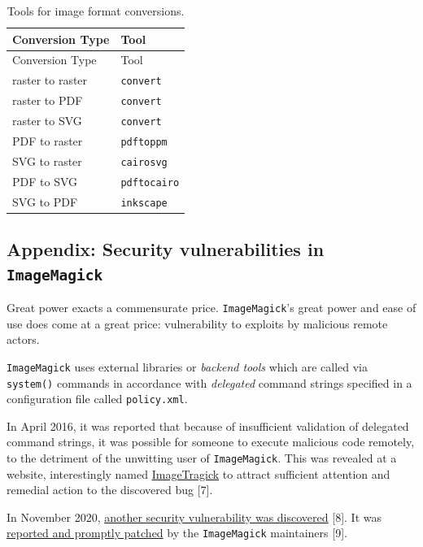 \documentclass[
  11pt,
  british,
  a4paper,
]{article}
\begin{document}
\begin{longtable}[]{@{}ll@{}}
\caption{Tools for image format conversions.
\label{tbl:formats}}\tabularnewline
\toprule
Conversion Type & Tool \\
\midrule
\endfirsthead
\toprule
Conversion Type & Tool \\
\midrule
\endhead
raster to raster & \texttt{convert} \\
raster to PDF & \texttt{convert} \\
raster to SVG & \texttt{convert} \\
PDF to raster & \texttt{pdftoppm} \\
SVG to raster & \texttt{cairosvg} \\
PDF to SVG & \texttt{pdftocairo} \\
SVG to PDF & \texttt{inkscape} \\
\bottomrule
\end{longtable}

\hypertarget{appendix-security-vulnerabilities-in-imagemagick}{%
\subsection{\texorpdfstring{Appendix: Security vulnerabilities in
\texttt{ImageMagick}}{Appendix: Security vulnerabilities in ImageMagick}}\label{appendix-security-vulnerabilities-in-imagemagick}}

Great power exacts a commensurate price. \texttt{ImageMagick}'s great
power and ease of use does come at a great price: vulnerability to
exploits by malicious remote actors.

\texttt{ImageMagick} uses external libraries or \emph{backend tools}
which are called via \texttt{system()} commands in accordance with
\emph{delegated} command strings specified in a configuration file
called \texttt{policy.xml}.

In April 2016, it was reported that because of insufficient validation
of delegated command strings, it was possible for someone to execute
malicious code remotely, to the detriment of the unwitting user of
\texttt{ImageMagick}. This was revealed at a website, interestingly
named \href{https://imagetragick.com/}{ImageTragick} to attract
sufficient attention and remedial action to the discovered bug {[}7{]}.

In November 2020,
\href{https://portswigger.net/daily-swig/imagemagick-pdf-parsing-flaw-allowed-attacker-to-execute-shell-commands-via-maliciously-crafted-image}{another
security vulnerability was discovered} {[}8{]}. It was
\href{https://insert-script.blogspot.com/2020/11/imagemagick-shell-injection-via-pdf.html}{reported
and promptly patched} by the \texttt{ImageMagick} maintainers {[}9{]}.
\end{document}
